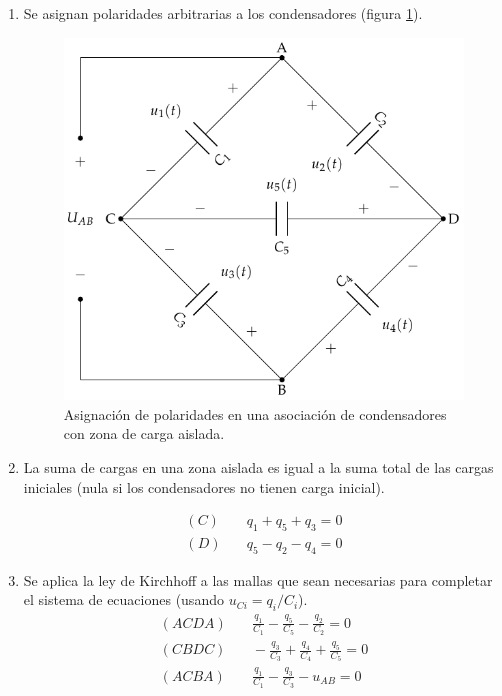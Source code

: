 \begin{enumerate}
\item Se asignan polaridades arbitrarias a los condensadores (figura
  \ref{fig:polaridades-zona-aislada}).
  \begin{figure}[H]
    \centering
    \includegraphics[height=0.25\textheight]{../figs/CondensadoresZonaAislada_Tensiones.pdf}
    \caption{Asignación de polaridades en una asociación de
      condensadores con zona de carga aislada.}
    \label{fig:polaridades-zona-aislada}
  \end{figure}

\item La suma de cargas en una zona aislada es igual a la suma total
  de las cargas iniciales (nula si los condensadores no tienen carga
  inicial).

\begin{align*}
  (C) &\quad q_1 + q_5 + q_3 = 0\\
  (D) &\quad q_5 - q_2 - q_4 = 0
\end{align*}

\item Se aplica la ley de Kirchhoff a las mallas que sean necesarias
  para completar el sistema de ecuaciones (usando
  \(u_{Ci} = q_i/C_i\)).
  \begin{align*}
    (ACDA) &\quad \frac{q_1}{C_1} - \frac{q_5}{C_5} - \frac{q_2}{C_2} = 0\\
    (CBDC) &\quad -\frac{q_3}{C_3} + \frac{q_4}{C_4} + \frac{q_5}{C_5} = 0\\
    (ACBA) &\quad \frac{q_1}{C_1} - \frac{q_3}{C_3} - u_{AB} = 0
  \end{align*}


\end{enumerate}
